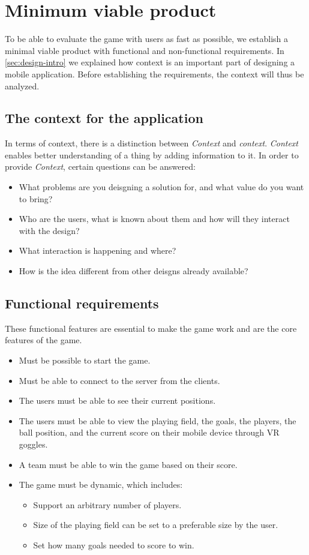 \section{Minimum viable product}\label{sec:mvp}
To be able to evaluate the game with users as fast as possible, we establish a minimal viable product with functional and non-functional requirements.
In \autoref{sec:design-intro} we explained how context is an important part of designing a mobile application.
Before establishing the requirements, the context will thus be analyzed.

\subsection{The context for the application}
In terms of context, there is a distinction between \textit{Context} and \textit{context}.
\textit{Context} enables better understanding of a thing by adding information to it.
In order to provide \textit{Context}, certain questions can be answered:
\begin{itemize}
    \item What problems are you deisgning a solution for, and what value do you want to bring?
    \item Who are the users, what is known about them and how will they interact with the design?
    \item What interaction is happening and where?
    \item How is the idea different from other deisgns already available?
\end{itemize}

\subsection{Functional requirements}
These functional features are essential to make the game work and are the core features of the game.

\begin{itemize}
    \item Must be possible to start the game.
    \item Must be able to connect to the server from the clients.
    \item The users must be able to see their current positions.
    \item The users must be able to view the playing field, the goals, the players, the ball position, and the current score on their mobile device through VR goggles.
    \item A team must be able to win the game based on their score.
    \item The game must be dynamic, which includes:
          \begin{itemize}
              \item Support an arbitrary number of players.
              \item Size of the playing field can be set to a preferable size by the user.
              \item Set how many goals needed to score to win.
          \end{itemize}
\end{itemize}

